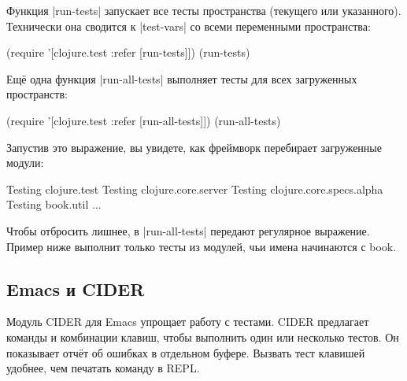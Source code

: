 
Функция \spverb|run-tests| запускает все тесты пространства (текущего или
указанного). Технически она сводится к \spverb|test-vars| со всеми переменными
пространства:

\begin{english}
  \begin{clojure}
(require '[clojure.test :refer [run-tests]])
(run-tests)
  \end{clojure}
\end{english}


Ещ\"{е} одна функция \spverb|run-all-tests| выполняет тесты для всех загруженных
пространств:

\begin{english}
  \begin{clojure}
(require '[clojure.test :refer [run-all-tests]])
(run-all-tests)
  \end{clojure}
\end{english}

Запустив это выражение, вы увидете, как фреймворк перебирает загруженные модули:

\begin{english}
  \begin{text}
Testing clojure.test
Testing clojure.core.server
Testing clojure.core.specs.alpha
Testing book.util
...
  \end{text}
\end{english}


Чтобы отбросить лишнее, в \spverb|run-all-tests| передают регулярное выражение.
Пример ниже выполнит только тесты из модулей, чьи имена начинаются с book.

\begin{english}
\end{english}

\subsection{Emacs и CIDER}


Модуль CIDER для Emacs упрощает
работу с тестами. CIDER предлагает команды и комбинации клавиш, чтобы выполнить
один или несколько тестов. Он показывает отч\"{е}т об ошибках в отдельном
буфере. Вызвать тест клавишей удобнее, чем печатать команду в REPL.

